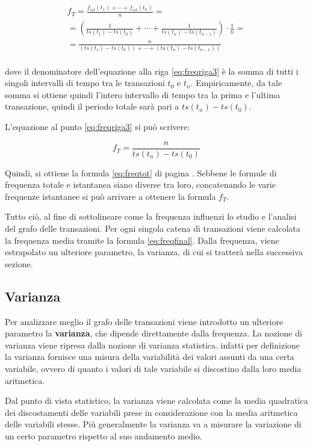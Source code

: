\begin{eqnarray}
	f_T = \frac{f_{ist}(t_1)+\cdots+f_{ist}(t_n)}{n} = \label{eq:freqriga1} \\[20pt]
	= \left( \frac{1}{ts(t_1) - ts(t_0)}+\cdots+\frac{1}{ ts(t_n) - ts(t_{n-1})} \right) \cdot \frac{1}{n} = \label{eq:freqriga2}\\[20pt]
	= \frac{n}{( ts(t_1) - ts(t_0))+\cdots+(ts(t_n) - ts(t_{n-1}) )} \label{eq:freqriga3}
\end{eqnarray}
\\
dove il denominatore dell'equazione alla riga \ref{eq:freqriga3} è la somma di tutti i singoli intervalli di tempo tra le transazioni $t_0$ e $t_n$. Empiricamente, da tale somma si ottiene quindi l'intero intervallo di tempo tra la prima e l'ultima transazione, quindi il periodo totale sarà pari a $ts(t_n) - ts(t_0)$. 

L'equazione al punto \ref{eq:freqriga3} si può scrivere:

\begin{equation}
	f_T =  \frac{n}{ts(t_n) - ts(t_0)}
	\label{eq:freqfinal}
\end{equation}

Quindi, si ottiene la formula \ref{eq:freqtot} di pagina \pageref{eq:freqtot}. Sebbene le formule di frequenza totale e istantanea siano diverse tra loro, concatenando le varie frequenze istantanee si può arrivare a ottenere la formula $f_T$. 

Tutto ciò, al fine di sottolineare come la frequenza influenzi lo studio e l'analisi del grafo delle transazioni. Per ogni singola catena di transazioni viene calcolata la frequenza media tramite la formula \ref{eq:freqfinal}. Dalla frequenza, viene estrapolato un ulteriore parametro, la varianza, di cui si tratterà nella successiva sezione.

\subsection{Varianza}
Per analizzare meglio il grafo delle transazioni viene introdotto un ulteriore parametro la \textbf{varianza}, che dipende direttamente dalla frequenza. 
La nozione di varianza viene ripresa dalla nozione di varianza statistica. infatti per definizione la varianza fornisce una misura della variabilità dei valori assunti da una certa variabile, ovvero di quanto i valori di tale variabile si discostino dalla loro media aritmetica. \cite{wiki:varianza}

Dal punto di vista statistico, la varianza viene calcolata come la media quadratica dei discostamenti delle variabili prese in considerazione con la media aritmetica delle variabili stesse. Più generalmente la varianza va a misurare la variazione di un certo parametro rispetto al suo andamento medio.

